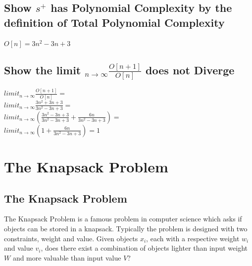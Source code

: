 \documentclass[11pt]{article}
\begin{document}
\subsection{Show $s^+$ has Polynomial Complexity by the definition of Total Polynomial Complexity}
\begin{center}
\vspace{2mm}
$
O[n] = 3n^2 -3n + 3
$
\end{center}

\subsection{Show the limit $_{n \rightarrow \infty}\frac{O[n+1]}{O[n]}$ does not Diverge}
\begin{center}
$
limit_{n \rightarrow \infty}\frac{O[n+1]}{O[n]} =
$
\\ \vspace{2mm}
$
limit_{n \rightarrow \infty}\frac{3n^2 + 3n + 3}{3n^2 - 3n + 3} =
$
\\ \vspace{2mm}
$
limit_{n \rightarrow \infty}(\frac{3n^2 - 3n + 3}{3n^2 - 3n + 3} + \frac{6n}{3n^2 - 3n + 3}) =
$
\\ \vspace{2mm}
$
limit_{n \rightarrow \infty}(1 + \frac{6n}{3n^2 - 3n + 3}) = 1
$
\end{center}







\newpage
\section{The Knapsack Problem}


\subsection{The Knapsack Problem}
The Knapsack Problem is a famous problem in computer science which asks if objects can be stored in a knapsack. Typically the problem is designed
with two constraints, weight and value. Given objects $x_i$, each with a respective weight $w_i$ and value $v_i$, does there exist a combination of
objects lighter than input weight $W$ and more valuable than input value $V$?


\end{document}
